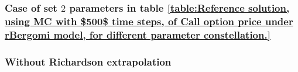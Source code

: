 \FloatBarrier

\subsubsection{Case of set $2$ parameters in table \ref{table:Reference solution, using MC with $500$ time steps, of Call option price under rBergomi model, for different parameter constellation.}}\label{sec:Case of set 3 parameters}


\subsubsection*{Without Richardson extrapolation}

%		
%		
%		


